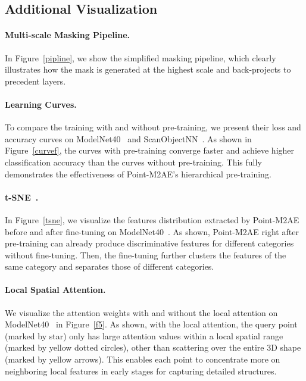\documentclass{article}
\begin{document}
\subsection{Additional Visualization}

\paragraph{Multi-scale Masking Pipeline.}
In Figure~\ref{pipline}, we show the simplified masking pipeline, which clearly illustrates how the mask is generated at the highest scale and back-projects to precedent layers.

\paragraph{Learning Curves.}
To compare the training with and without pre-training, we present their loss and accuracy curves on ModelNet40~\cite{modelnet40} and ScanObjectNN~\cite{scanobjectnn}. As shown in Figure~\ref{curvef}, the curves with pre-training converge faster and achieve higher classification accuracy than the curves without pre-training. This fully demonstrates the effectiveness of Point-M2AE's hierarchical pre-training.

\paragraph{t-SNE~\cite{van2008visualizing}.}
In Figure~\ref{tsne}, we visualize the features distribution extracted by Point-M2AE before and after fine-tuning on ModelNet40~\cite{modelnet40}. As shown, Point-M2AE right after pre-training can already produce discriminative features for different categories without fine-tuning. Then, the fine-tuning further clusters the features of the same category and separates those of different categories.

\paragraph{Local Spatial Attention.}
We visualize the attention weights with and without the local attention on ModelNet40~\cite{modelnet40} in Figure~\ref{f5}. As shown, with the local attention, the query point (marked by star) only has large attention values within a local spatial range (marked by yellow dotted circles), other than scattering over the entire 3D shape (marked by yellow arrows). This enables each point to concentrate more on neighboring local features in early stages for capturing detailed structures.
\end{document}
